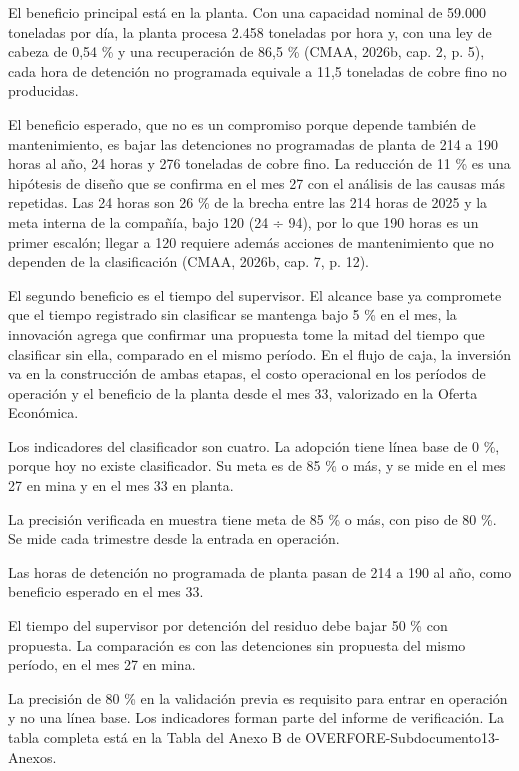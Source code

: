 \documentclass[subdoc]{../../comun/overfore}
\begin{document}
El beneficio principal está en la planta. Con una capacidad nominal de 59.000 toneladas por día, la planta procesa 2.458 toneladas por hora y, con una ley de cabeza de 0,54 \% y una recuperación de 86,5 \% (CMAA, 2026b, cap. 2, p. 5), cada hora de detención no programada equivale a 11,5 toneladas de cobre fino no producidas.

El beneficio esperado, que no es un compromiso porque depende también de mantenimiento, es bajar las detenciones no programadas de planta de 214 a 190 horas al año, 24 horas y 276 toneladas de cobre fino. La reducción de 11 \% es una hipótesis de diseño que se confirma en el mes 27 con el análisis de las causas más repetidas. Las 24 horas son 26 \% de la brecha entre las 214 horas de 2025 y la meta interna de la compañía, bajo 120 (24 ÷ 94), por lo que 190 horas es un primer escalón; llegar a 120 requiere además acciones de mantenimiento que no dependen de la clasificación (CMAA, 2026b, cap. 7, p. 12).

El segundo beneficio es el tiempo del supervisor. El alcance base ya compromete que el tiempo registrado sin clasificar se mantenga bajo 5 \% en el mes, la innovación agrega que confirmar una propuesta tome la mitad del tiempo que clasificar sin ella, comparado en el mismo período. En el flujo de caja, la inversión va en la construcción de ambas etapas, el costo operacional en los períodos de operación y el beneficio de la planta desde el mes 33, valorizado en la Oferta Económica.

Los indicadores del clasificador son cuatro. La adopción tiene línea base de 0 \%, porque hoy no existe clasificador. Su meta es de 85 \% o más, y se mide en el mes 27 en mina y en el mes 33 en planta.

La precisión verificada en muestra tiene meta de 85 \% o más, con piso de 80 \%. Se mide cada trimestre desde la entrada en operación.

Las horas de detención no programada de planta pasan de 214 a 190 al año, como beneficio esperado en el mes 33.

El tiempo del supervisor por detención del residuo debe bajar 50 \% con propuesta. La comparación es con las detenciones sin propuesta del mismo período, en el mes 27 en mina.

La precisión de 80 \% en la validación previa es requisito para entrar en operación y no una línea base. Los indicadores forman parte del informe de verificación. La tabla completa está en la Tabla  del Anexo B de OVERFORE-Subdocumento13-Anexos.
\end{document}
